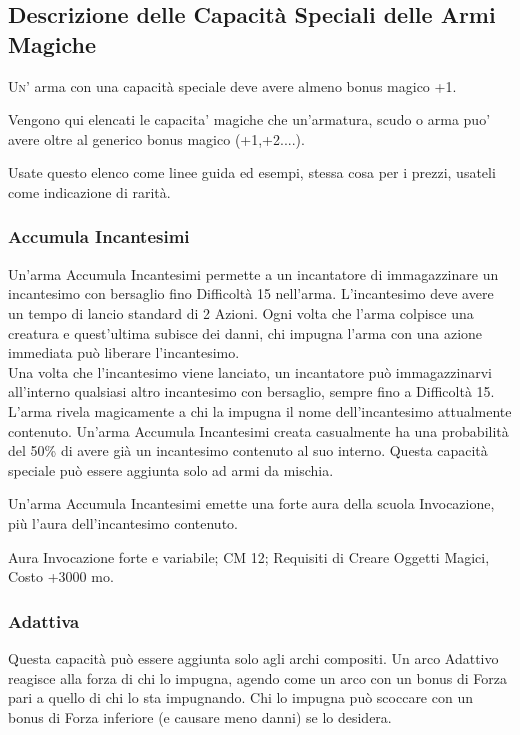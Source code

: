 \subsection{Descrizione delle Capacità Speciali delle Armi Magiche}

\lettrine[lines=2, lhang=0.33, loversize=0.25, findent=1.5em]{U}{n'} arma con una capacità speciale deve avere almeno bonus magico +1.

Vengono qui elencati le capacita' magiche che un'armatura, scudo o arma puo' avere oltre al generico bonus magico (+1,+2....).

Usate questo elenco come linee guida ed esempi, stessa cosa per i prezzi, usateli come indicazione di rarità.

\begin{multicols}{2}

\subsubsection{Accumula Incantesimi}

Un'arma Accumula Incantesimi permette a un incantatore di immagazzinare un incantesimo con bersaglio fino Difficoltà 15 nell'arma. L'incantesimo deve avere un tempo di lancio standard di 2 Azioni. Ogni volta che l'arma colpisce una creatura e quest'ultima subisce dei danni, chi impugna l'arma con una azione immediata può liberare l'incantesimo.\\
Una volta che l'incantesimo viene lanciato, un incantatore può immagazzinarvi all'interno qualsiasi altro incantesimo con bersaglio, sempre fino a Difficoltà 15.\\
L'arma rivela magicamente a chi la impugna il nome dell'incantesimo attualmente contenuto. Un'arma Accumula Incantesimi creata casualmente ha una probabilità del 50\% di avere già un incantesimo contenuto al suo interno. Questa capacità speciale può essere aggiunta solo ad armi da mischia.

Un'arma Accumula Incantesimi emette una forte aura della scuola Invocazione, più l'aura dell'incantesimo contenuto.

Aura Invocazione forte e variabile; CM 12; Requisiti di Creare Oggetti Magici, Costo +3000 mo.

\subsubsection{Adattiva}

Questa capacità può essere aggiunta solo agli archi compositi. Un arco Adattivo reagisce alla forza di chi lo impugna, agendo come un arco con un bonus di Forza pari a quello di chi lo sta impugnando. Chi lo impugna può scoccare con un bonus di Forza inferiore (e causare meno danni) se lo desidera.


\end{multicols}
